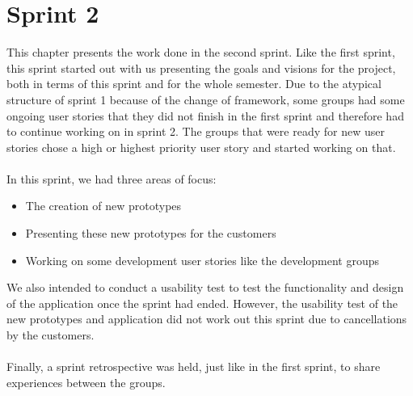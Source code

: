 \chapter{Sprint 2}
This chapter presents the work done in the second sprint.
Like the first sprint, this sprint started out with us presenting the goals and visions for the project, both in terms of this sprint and for the whole semester.
Due to the atypical structure of sprint 1 because of the change of framework, some groups had some ongoing user stories that they did not finish in the first sprint and therefore had to continue working on in sprint 2.
The groups that were ready for new user stories chose a high or highest priority user story and started working on that.
\\\\
In this sprint, we had three areas of focus:
\begin{itemize}
\item The creation of new prototypes
\item Presenting these new prototypes for the customers
\item Working on some development user stories like the development groups
\end{itemize}
We also intended to conduct a usability test to test the functionality and design of the application once the sprint had ended.
However, the usability test of the new prototypes and application did not work out this sprint due to cancellations by the customers. 
\\\\
Finally, a sprint retrospective was held, just like in the first sprint, to share experiences between the groups.
